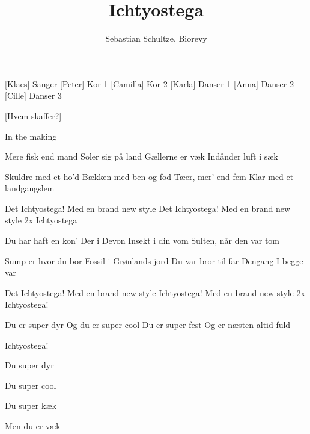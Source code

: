 \documentclass[a4paper,12pt]{article}
\title{Ichtyostega}
\author{Sebastian Schultze, Biorevy}
\begin{document}
\maketitle

\begin{roles}
	[Klaes] Sanger
	[Peter] Kor 1
	[Camilla] Kor 2
	[Karla] Danser 1
	[Anna] Danser 2
	[Cille] Danser 3
\end{roles}


\begin{props}
	[Hvem skaffer?]
\end{props}

\scene In the making

\begin{song}


Mere fisk end mand
Soler sig på land
Gællerne er væk
Indånder luft i sæk

Skuldre med et ho'd
Bækken med ben og fod
Tæer, mer' end fem
Klar med et landgangslem

Det Ichtyostega!
Med en brand new style
Det Ichtyostega!
Med en brand new style
2x Ichtyostega

Du har haft en kon'
Der i Devon
Insekt i din vom
Sulten, når den var tom

Sump er hvor du bor
Fossil i Grønlands jord
Du var bror til far
Dengang I begge var

Det Ichtyostega!
Med en brand new style
Ichtyostega!
Med en brand new style
2x Ichtyostega!

Du er super dyr
Og du er super cool
Du er super fest
Og er næsten altid fuld

Ichtyostega!

Du super dyr

Du super cool

Du super kæk

Men du er væk



\end{song}
\end{document}

